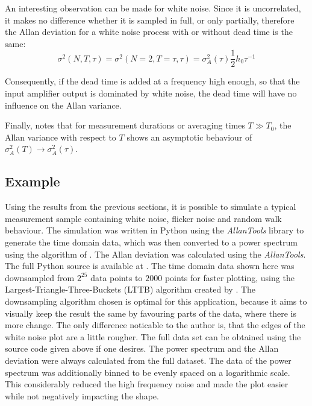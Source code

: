 An interesting observation can be made for white noise. Since it is uncorrelated, it makes no difference whether it is sampled in full, or only partially, therefore the Allan deviation for a white noise process with or without dead time is the same:
\begin{equation}
    \sigma^2(N,T, \tau) = \sigma^2(N=2,T=\tau, \tau) = \sigma_A^2(\tau) \frac 1 2 h_0 \tau^{-1}
\end{equation}

Consequently, if the dead time is added at a frequency high enough, so that the input amplifier output is dominated by white noise, the dead time will have no influence on the Allan variance.

Finally, \citeauthor{psd_to_adev} \cite{psd_to_adev} notes that for measurement durations or averaging times $T \gg T_0$, the Allan variance with respect to $T$ shows an asymptotic behaviour of $\sigma_A^2(T) \to \sigma_A^2(\tau)$.

\clearpage
\subsection{Example}
\label{sec:noise_example}
Using the results from the previous sections, it is possible to simulate a typical measurement sample containing white noise, flicker noise and random walk behaviour. The simulation was written in Python using the \textit{AllanTools} library \cite{allantools} to generate the time domain data, which was then converted to a power spectrum using the algorithm of \citeauthor{welch} \cite{welch}. The Allan deviation was calculated using the \textit{AllanTools}. The full Python source is available at \cite{}. The time domain data shown here was downsampled from $2^{25}$ data points to $2000$ points for faster plotting, using the Largest-Triangle-Three-Buckets (LTTB) algorithm created by \citeauthor{lttb} \cite{lttb}. The downsampling algorithm chosen is optimal for this application, because it aims to visually keep the result the same by favouring parts of the data, where there is more change. The only difference noticable to the author is, that the edges of the white noise plot are a little rougher. The full data set can be obtained using the source code given above if one desires. The power spectrum and the Allan deviation were always calculated from the full dataset. The data of the power spectrum was additionally binned to be evenly spaced on a logarithmic scale. This considerably reduced the high frequency noise and made the plot easier while not negatively impacting the shape.

